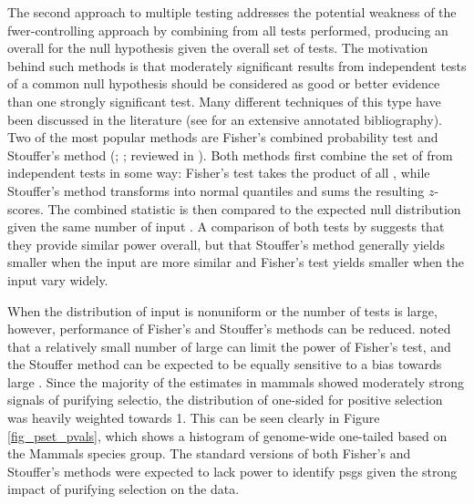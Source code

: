 The second approach to multiple testing addresses the potential
weakness of the \ac{fwer}-controlling approach by combining \pvs from
all \sw tests performed, producing an overall \pv for the null
hypothesis given the overall set of tests. The motivation behind such
methods is that moderately significant results from independent tests
of a common null hypothesis should be considered as good or better
evidence than one strongly significant test. Many different techniques
of this type have been discussed in the literature (see
\citet{Cousins2007} for an extensive annotated bibliography). Two of
the most popular methods are Fisher's combined probability test and
Stouffer's method (\citealp{Fisher1932}; \citealp{Stouffer1949};
reviewed in \citealp{Whitlock2005}). Both methods first combine the
set of \pvs from independent tests in some way: Fisher's test takes
the product of all \pvs, while Stouffer's method transforms
\pvs into normal quantiles and sums the resulting $z$-scores. The
combined statistic is then compared to the expected null distribution
given the same number of input \pvs. A comparison of both tests by
\citet{Darlington2000} suggests that they provide similar power
overall, but that Stouffer's method generally yields smaller \pvs
when the input \pvs are more similar and Fisher's test yields
smaller \pvs when the input \pvs vary widely.

When the distribution of input \pvs is nonuniform or the number of
tests is large, however, performance of Fisher's and Stouffer's
methods can be reduced. \citet{Zaykin2002} noted that a relatively
small number of large \pvs can limit the power of Fisher's test,
and the Stouffer method can be expected to be equally sensitive to a
bias towards large \pvs. Since the majority of the \sw estimates in
mammals showed moderately strong signals of purifying selectio, the
distribution of one-sided \pvs for positive selection was heavily
weighted towards 1. This can be seen clearly in Figure \ref{fig_pset_pvals},
which shows a histogram of genome-wide one-tailed \pvs based on the
Mammals species group. The standard versions of both Fisher's and
Stouffer's methods were expected to lack power to identify \acp{psg}
given the strong impact of purifying selection on the \sw data.

